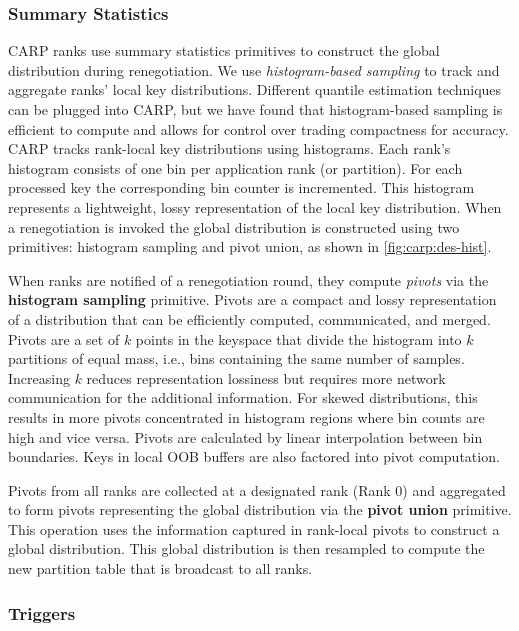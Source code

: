 \subsubsection{Summary Statistics} \label{sec:carp:des_hist}
CARP ranks use summary statistics primitives to construct the global distribution during
renegotiation.
We use \emph{histogram-based sampling} to track and aggregate ranks' local key distributions.
Different quantile estimation techniques can be plugged into CARP, but we have found that
histogram-based sampling is efficient to compute and allows for control over trading compactness
for accuracy.
CARP tracks rank-local key distributions using histograms.
Each rank's histogram consists of one bin per application rank (or partition).
For each processed key the corresponding bin counter is incremented.
This histogram represents a lightweight, lossy representation of the local key distribution.
When a renegotiation is invoked the global distribution is constructed using two primitives:
histogram sampling and pivot union, as shown in \cref{fig:carp:des-hist}.

When ranks are notified of a renegotiation round, they compute \emph{pivots} via the
\textbf{histogram sampling} primitive.
Pivots are a compact and lossy representation of a distribution that can be efficiently computed,
communicated, and merged.
Pivots are a set of $k$ points in the keyspace that divide the histogram into $k$ partitions of
equal mass, i.e., bins containing the same number of samples.
Increasing $k$ reduces representation lossiness but requires more network communication for the
additional information.
For skewed distributions, this results in more pivots concentrated in histogram regions where bin
counts are high and vice versa.
Pivots are calculated by linear interpolation between bin boundaries.
Keys in local OOB buffers are also factored into pivot computation.

Pivots from all ranks are collected at a designated rank (Rank 0) and aggregated to form pivots
representing the global distribution via the \textbf{pivot union} primitive.
This operation uses the information captured in rank-local pivots to construct a global
distribution.
This global distribution is then resampled to compute the new partition table that is broadcast to
all ranks.

\subsubsection{Triggers}
\label{sec:carp:des_trig}

